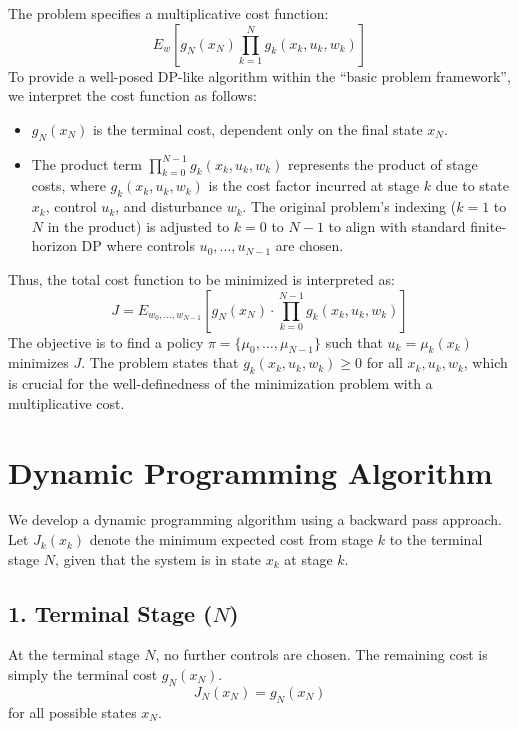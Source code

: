\documentclass[11pt, a4paper, oneside]{memoir}
\begin{document}
The problem specifies a multiplicative cost function:
\[
E_w[g_N(x_N)\prod_{k=1}^{N}g_k(x_k,u_k,w_k)]
\]
To provide a well-posed DP-like algorithm within the ``basic problem framework'', we interpret the cost function as follows:
\begin{itemize}
    \item $g_N(x_N)$ is the terminal cost, dependent only on the final state $x_N$.
    \item The product term $\prod_{k=0}^{N-1} g_k(x_k, u_k, w_k)$ represents the product of stage costs, where $g_k(x_k, u_k, w_k)$ is the cost factor incurred at stage $k$ due to state $x_k$, control $u_k$, and disturbance $w_k$. The original problem's indexing ($k=1$ to $N$ in the product) is adjusted to $k=0$ to $N-1$ to align with standard finite-horizon DP where controls $u_0, \dots, u_{N-1}$ are chosen.
\end{itemize}
Thus, the total cost function to be minimized is interpreted as:
\[
J = E_{w_0, \dots, w_{N-1}}\left[g_N(x_N) \cdot \prod_{k=0}^{N-1} g_k(x_k, u_k, w_k)\right]
\]
The objective is to find a policy $\pi = \{\mu_0, \dots, \mu_{N-1}\}$ such that $u_k = \mu_k(x_k)$ minimizes $J$.
The problem states that $g_k(x_k, u_k, w_k) \ge 0$ for all $x_k, u_k, w_k$,
which is crucial for the well-definedness of the minimization problem with a multiplicative cost.

\section{Dynamic Programming Algorithm}
We develop a dynamic programming algorithm using a backward pass approach. Let $J_k(x_k)$ denote the minimum expected cost from stage $k$ to the terminal stage $N$, given that the system is in state $x_k$ at stage $k$.
\subsection*{1. Terminal Stage ($N$)}
At the terminal stage $N$, no further controls are chosen. The remaining cost is simply the terminal cost $g_N(x_N)$.
\[
J_N(x_N) = g_N(x_N)
\]
for all possible states $x_N$.
\end{document}
